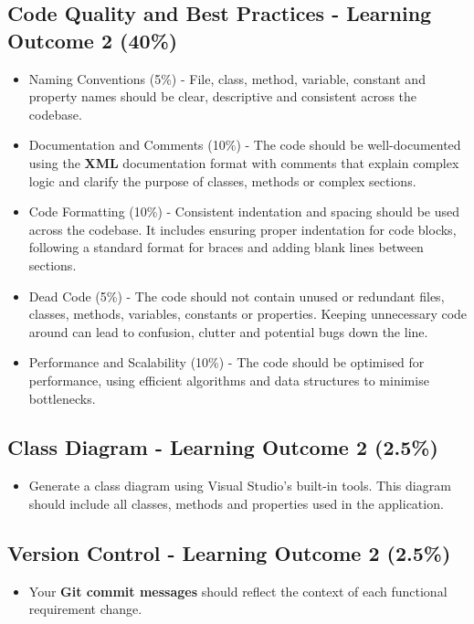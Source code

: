 \documentclass{article}
\begin{document}
\subsection*{Code Quality and Best Practices - Learning Outcome 2 (40\%)}
\begin{itemize}
    \item Naming Conventions (5\%) - File, class, method, variable, constant and property names should be clear, descriptive and consistent across the codebase. 
    \item Documentation and Comments (10\%) - The code should be well-documented using the \textbf{XML} documentation format with comments that explain complex logic and clarify the purpose of classes, methods or complex sections. 
    \item Code Formatting (10\%) - Consistent indentation and spacing should be used across the codebase. It includes ensuring proper indentation for code blocks, following a standard format for braces and adding blank lines between sections.
    \item Dead Code (5\%) - The code should not contain unused or redundant files, classes, methods, variables, constants or properties. Keeping unnecessary code around can lead to confusion, clutter and potential bugs down the line.
    \item Performance and Scalability (10\%) - The code should be optimised for performance, using efficient algorithms and data structures to minimise bottlenecks. 
\end{itemize}

\subsection*{Class Diagram - Learning Outcome 2 (2.5\%)}
\begin{itemize}
    \item Generate a class diagram using Visual Studio's built-in tools. This diagram should include all classes, methods and properties used in the application.
\end{itemize}

\subsection*{Version Control - Learning Outcome 2 (2.5\%)}
\begin{itemize}
    \item Your \textbf{Git commit messages} should reflect the context of each functional requirement change.
\end{itemize}
\end{document}
